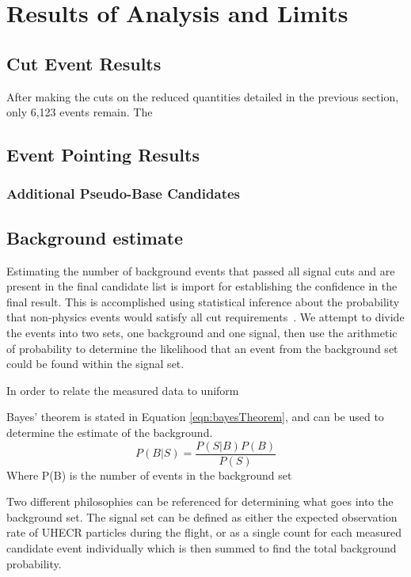 			
\chapter{Results of Analysis and Limits}
\section{Cut Event Results}
	After making the cuts on the reduced quantities detailed in the previous section, only 6,123 events remain.  The 
	
\section{Event Pointing Results}
	\subsection{Additional Pseudo-Base Candidates}

\section{Background estimate}
	Estimating the number of background events that passed all signal cuts and are present in the final candidate list is import for establishing the confidence in the final result.  This is accomplished using statistical inference about the probability that non-physics events would satisfy all cut requirements~\cite{ClassicalStatisticalEstimation}.  We attempt to divide the events into two sets, one background and one signal, then use the arithmetic of probability to determine the likelihood that an event from the background set could be found within the signal set.  
	
	In order to relate the measured data to uniform 
	
	Bayes' theorem is stated in Equation \ref{eqn:bayesTheorem}, and can be used to determine the estimate of the background.
	\begin{equation}
		P(B | S) = \frac{P(S | B) P(B)}{P(S)}
		\label{eqn:bayesTheorem}
	\end{equation}
	Where P(B) is the number of events in the background set
	
	
	Two different philosophies can be referenced for determining what goes into the background set.  The signal set can be defined as either the expected observation rate of UHECR particles during the flight, or as a single count for each measured candidate event individually which is then summed to find the total background probability.
	
